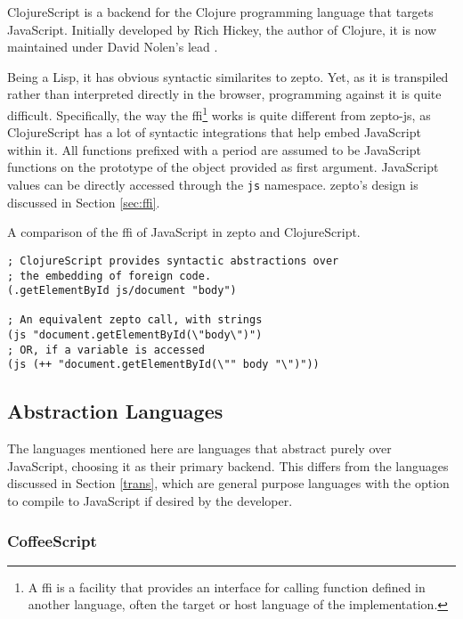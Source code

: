\documentclass[oneside,11pt,xetex]{scrbook}
\begin{document}
ClojureScript is a backend for the Clojure programming language that targets
JavaScript. Initially developed by Rich Hickey, the author of Clojure, it is
now maintained under David Nolen's lead \parencite{CLJS}.

Being a Lisp, it has obvious syntactic similarites to zepto. Yet, as it is
transpiled rather than interpreted directly in the browser, programming against
it is quite difficult. Specifically, the way the \gls{ffi}\footnote{A \gls{ffi}
is a facility that provides an interface for calling function defined in another
language, often the target or host language of the implementation.} works is quite
different from zepto-js, as ClojureScript has a lot of syntactic integrations
that help embed JavaScript within it. All functions prefixed with a period are
assumed to be JavaScript functions on the prototype of the object provided as
first argument. JavaScript values can be directly accessed through the \texttt{js}
namespace. zepto's design is discussed in Section \ref{sec:ffi}.

\begin{listing}[H]
\caption{A comparison of the \gls{ffi} of JavaScript in zepto and ClojureScript.}
\begin{verbatim}
; ClojureScript provides syntactic abstractions over
; the embedding of foreign code.
(.getElementById js/document "body")

; An equivalent zepto call, with strings
(js "document.getElementById(\"body\")")
; OR, if a variable is accessed
(js (++ "document.getElementById(\"" body "\")"))
\end{verbatim}
\end{listing}

\subsection{Abstraction Languages}

The languages mentioned here are languages that abstract purely over JavaScript,
choosing it as their primary backend. This differs from the languages discussed
in Section \ref{trans}, which are general purpose languages with the option to compile
to JavaScript if desired by the developer.

\subsubsection{CoffeeScript}
\end{document}
